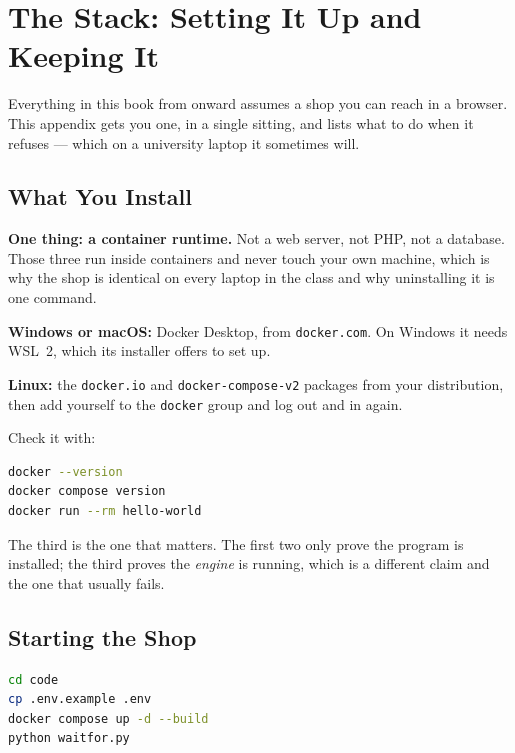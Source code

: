 \chapter{The Stack: Setting It Up and Keeping It}\label{app:stack}
\normalfigures

Everything in this book from  onward assumes a shop you can reach
in a browser. This appendix gets you one, in a single sitting, and lists what
to do when it refuses --- which on a university laptop it sometimes will.

\section{What You Install}

\textbf{One thing: a container runtime.} Not a web server, not PHP, not a
database. Those three run inside containers and never touch your own machine,
which is why the shop is identical on every laptop in the class and why
uninstalling it is one command.

\begin{tight}
  \item \textbf{Windows or macOS:} Docker Desktop, from
        \texttt{docker.com}. On Windows it needs WSL~2, which its installer
        offers to set up.
  \item \textbf{Linux:} the \texttt{docker.io} and \texttt{docker-compose-v2}
        packages from your distribution, then add yourself to the
        \texttt{docker} group and log out and in again.
\end{tight}

Check it with:

\begin{lstlisting}[language=bash]
docker --version
docker compose version
docker run --rm hello-world
\end{lstlisting}

The third is the one that matters. The first two only prove the program is
installed; the third proves the \emph{engine} is running, which is a different
claim and the one that usually fails.

\section{Starting the Shop}

\begin{lstlisting}[language=bash]
cd code
cp .env.example .env
docker compose up -d --build
python waitfor.py
\end{lstlisting}


